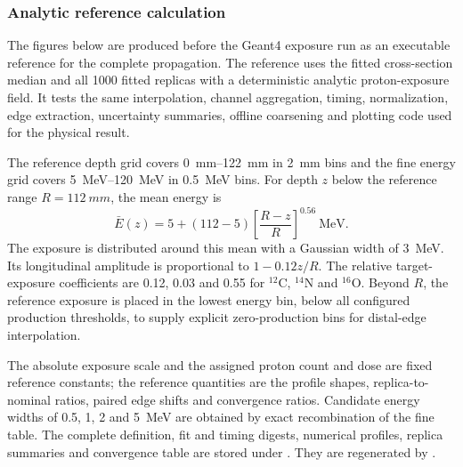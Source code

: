 \documentclass[11pt]{article}
\newcommand{\foldgenerateddir}{docs/generated/xsection_folding}
\newcommand{\foldgenerateddir}{generated/xsection_folding}
\begin{document}
\subsubsection{Analytic reference calculation}

The figures below are produced before the Geant4 exposure run as an executable
reference for the complete propagation.  The reference uses the fitted
cross-section median and all 1000 fitted replicas with a deterministic analytic
proton-exposure field.  It tests the same interpolation, channel aggregation,
timing, normalization, edge extraction, uncertainty summaries, offline
coarsening and plotting code used for the physical result.

The reference depth grid covers \SIrange{0}{122}{mm} in \SI{2}{mm} bins and
the fine energy grid covers \SIrange{5}{120}{MeV} in \SI{0.5}{MeV} bins.  For
depth $z$ below the reference range $R=\SI{112}{mm}$, the mean energy is
\begin{equation}
 \bar E(z)=5+(112-5)
 \left[\frac{R-z}{R}\right]^{0.56}\ \mathrm{MeV}.
 \label{eq:reference-energy}
\end{equation}
The exposure is distributed around this mean with a Gaussian width of
\SI{3}{MeV}.  Its longitudinal amplitude is proportional to
$1-0.12z/R$.  The relative target-exposure coefficients are 0.12, 0.03 and
0.55 for $^{12}$C, $^{14}$N and $^{16}$O.  Beyond $R$, the reference exposure
is placed in the lowest energy bin, below all configured production
thresholds, to supply explicit zero-production bins for distal-edge
interpolation.

The absolute exposure scale and the assigned proton count and dose are fixed
reference constants; the reference quantities are the profile shapes,
replica-to-nominal ratios, paired edge shifts and convergence ratios.  Candidate energy widths of 0.5, 1, 2
and \SI{5}{MeV} are obtained by exact recombination of the fine table.  The
complete definition, fit and timing digests, numerical profiles, replica
summaries and convergence table are stored under
.  They are regenerated by
.

\begin{table}[H]
\centering\small
\caption{Analytic-reference folding summary.  The yield half-width and $u_R$
are half the 16th--84th percentile intervals.  The absolute yields are omitted
because the analytic exposure normalization is arbitrary.}
\label{tab:folding-reference-summary}

\end{table}
\end{document}
